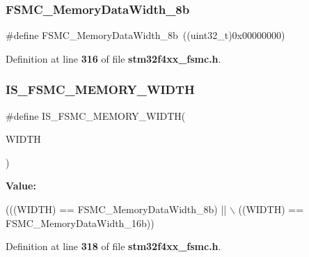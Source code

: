 \subsubsection{F\+S\+M\+C\+\_\+\+Memory\+Data\+Width\+\_\+8b}
{\footnotesize\ttfamily \#define F\+S\+M\+C\+\_\+\+Memory\+Data\+Width\+\_\+8b~((uint32\+\_\+t)0x00000000)}



Definition at line \textbf{ 316} of file \textbf{ stm32f4xx\+\_\+fsmc.\+h}.

\mbox{\label{group__FSMC__Data__Width_ga003d52b62f5950fb041f73f15ce20171}} 
\subsubsection{I\+S\+\_\+\+F\+S\+M\+C\+\_\+\+M\+E\+M\+O\+R\+Y\+\_\+\+W\+I\+D\+TH}
{\footnotesize\ttfamily \#define I\+S\+\_\+\+F\+S\+M\+C\+\_\+\+M\+E\+M\+O\+R\+Y\+\_\+\+W\+I\+D\+TH(\begin{DoxyParamCaption}\item[{}]{W\+I\+D\+TH }\end{DoxyParamCaption})}

{\bfseries Value\+:}
\begin{DoxyCode}
(((WIDTH) == FSMC_MemoryDataWidth_8b) || \(\backslash\)
                                     ((WIDTH) == FSMC_MemoryDataWidth_16b))
\end{DoxyCode}


Definition at line \textbf{ 318} of file \textbf{ stm32f4xx\+\_\+fsmc.\+h}.

